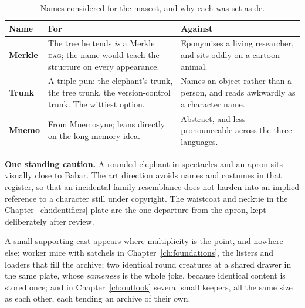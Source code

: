 \begin{table}[htbp]
  \centering\small
  \caption[Names considered for the mascot]{Names considered for the mascot, and why each was
  set aside.}
  \label{tab:archie-names}
  \begin{tabularx}{\linewidth}{@{}>{\raggedright\arraybackslash}p{1.8cm}%
                                 >{\raggedright\arraybackslash}X%
                                 >{\raggedright\arraybackslash}X@{}}
    \toprule
    \textbf{Name} & \textbf{For} & \textbf{Against} \\
    \midrule
    \textbf{Merkle}
      & The tree he tends \emph{is} a Merkle \textsc{dag}; the name would teach the structure
        on every appearance.
      & Eponymises a living researcher, and sits oddly on a cartoon animal. \\
    \addlinespace
    \textbf{Trunk}
      & A triple pun: the elephant's trunk, the tree trunk, the version-control trunk. The
        wittiest option.
      & Names an object rather than a person, and reads awkwardly as a character name. \\
    \addlinespace
    \textbf{Mnemo}
      & From Mnemosyne; leans directly on the long-memory idea.
      & Abstract, and less pronounceable across the three languages. \\
    \bottomrule
  \end{tabularx}
\end{table}


\textbf{One standing caution.} A rounded elephant in spectacles and an apron sits visually close
to Babar. The art direction avoids names and costumes in that register, so that an incidental
family resemblance does not harden into an implied reference to a character still under
copyright. The waistcoat and necktie in the Chapter~\ref{ch:identifiers} plate are the one
departure from the apron, kept deliberately after review.

A small supporting cast appears where multiplicity is the point, and nowhere else: worker mice
with satchels in Chapter~\ref{ch:foundations}, the listers and loaders that fill the archive;
two identical round creatures at a shared drawer in the same plate, whose \emph{sameness} is the
whole joke, because identical content is stored once; and in Chapter~\ref{ch:outlook} several
small keepers, all the same size as each other, each tending an archive of their own.


